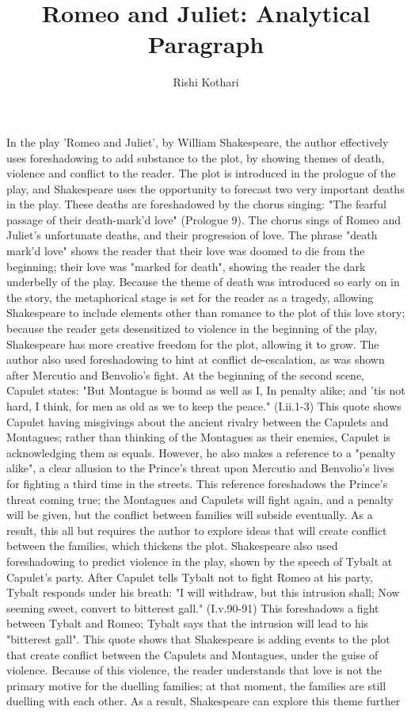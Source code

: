 \documentclass[12pt]{report}
\title{\Huge Romeo and Juliet: Analytical Paragraph}
\author{\LARGE Rishi Kothari}
\date{}
\begin{document}
\maketitle

\newpage


In the play 'Romeo and Juliet', by William Shakespeare, the author effectively uses foreshadowing to add substance to the plot, by showing themes of death, violence and conflict to the reader. The plot is introduced in the prologue of the play, and Shakespeare uses the opportunity to forecast two very important deaths in the play. These deaths are foreshadowed by the chorus singing: "The fearful passage of their death-mark'd love" (Prologue 9). The chorus sings of Romeo and Juliet's unfortunate deaths, and their progression of love. The phrase "death mark'd love" shows the reader that their love was doomed to die from the beginning; their love was "marked for death", showing the reader the dark underbelly of the play. Because the theme of death was introduced so early on in the story, the metaphorical stage is set for the reader as a tragedy, allowing Shakespeare to include elements other than romance to the plot of this love story; because the reader gets desensitized to violence in the beginning of the play, Shakespeare has more creative freedom for the plot, allowing it to grow. The author also used foreshadowing to hint at conflict de-escalation, as was shown after Mercutio and Benvolio's fight. At the beginning of the second scene, Capulet states: "But Montague is bound as well as I, In penalty alike; and 'tis not hard, I think, for men as old as we to keep the peace." (I.ii.1-3) This quote shows Capulet having misgivings about the ancient rivalry between the Capulets and Montagues; rather than thinking of the Montagues as their enemies, Capulet is acknowledging them as equals. However, he also makes a reference to a "penalty alike", a clear allusion to the Prince's threat upon Mercutio and Benvolio's lives for fighting a third time in the streets. This reference foreshadows the Prince's threat coming true; the Montagues and Capulets will fight again, and a penalty will be given, but the conflict between families will subside eventually. As a result, this all but requires the author to explore ideas that will create conflict between the families, which thickens the plot. Shakespeare also used foreshadowing to predict violence in the play, shown by the speech of Tybalt at Capulet's party. After Capulet tells Tybalt not to fight Romeo at his party, Tybalt responds under his breath: "I will withdraw, but this intrusion shall; Now seeming sweet, convert to bitterest gall." (I.v.90-91) This foreshadows a fight between Tybalt and Romeo; Tybalt says that the intrusion will lead to his "bitterest gall". This quote shows that Shakespeare is adding events to the plot that create conflict between the Capulets and Montagues, under the guise of violence. Because of this violence, the reader understands that love is not the primary motive for the duelling families; at that moment, the families are still duelling with each other. As a result, Shakespeare can explore this theme further 
\end{document}
